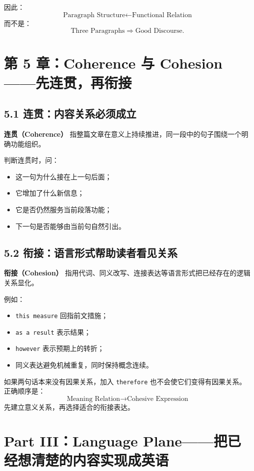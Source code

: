 \documentclass[11pt,a4paper]{ctexart}
\newcommand{\term}[2]{\textbf{#1（#2）}}
\begin{document}
因此：
\[
\boxed{
\text{Paragraph Structure}
\leftarrow
\text{Functional Relation}
}
\]
而不是：
\[
\text{Three Paragraphs}
\Rightarrow
\text{Good Discourse}.
\]

\section{第 5 章：Coherence 与 Cohesion——先连贯，再衔接}

\subsection{5.1 连贯：内容关系必须成立}
\term{连贯}{Coherence} 指整篇文章在意义上持续推进，同一段中的句子围绕一个明确功能组织。

判断连贯时，问：
\begin{itemize}
  \item 这一句为什么接在上一句后面；
  \item 它增加了什么新信息；
  \item 它是否仍然服务当前段落功能；
  \item 下一句是否能够由当前句自然引出。
\end{itemize}

\subsection{5.2 衔接：语言形式帮助读者看见关系}
\term{衔接}{Cohesion} 指用代词、同义改写、连接表达等语言形式把已经存在的逻辑关系显化。

例如：
\begin{itemize}
  \item \texttt{this measure} 回指前文措施；
  \item \texttt{as a result} 表示结果；
  \item \texttt{however} 表示预期上的转折；
  \item 同义表达避免机械重复，同时保持概念连续。
\end{itemize}

\begin{warn}[不要把连接词当作语篇结构本身]
如果两句话本来没有因果关系，加入 \texttt{therefore} 也不会使它们变得有因果关系。正确顺序是：
\[
\boxed{
\text{Meaning Relation}
\rightarrow
\text{Cohesive Expression}
}
\]
先建立意义关系，再选择适合的衔接表达。
\end{warn}

\newpage
\section{Part III：Language Plane——把已经想清楚的内容实现成英语}
\end{document}
